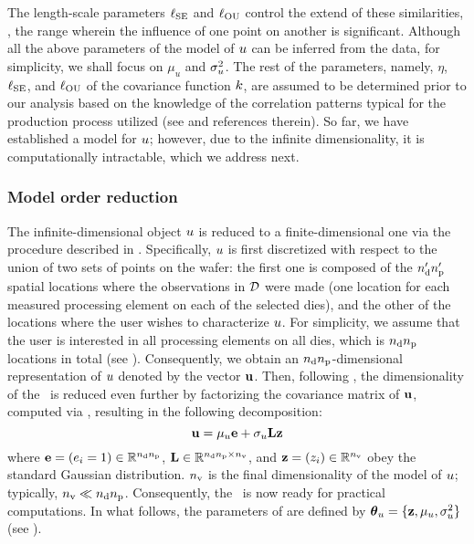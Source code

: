 The length-scale parameters $\ell_{\text{SE}}$ and $\ell_{\text{OU}}$ control the extend of these similarities, \ie, the range wherein the influence of one point on another is significant.
Although all the above parameters of the model of $u$ can be inferred from the data, for simplicity, we shall focus on $\mu_u$ and $\sigma_u^2$.
The rest of the parameters, namely, $\eta$, $\ell_{\text{SE}}$, and $\ell_{\text{OU}}$ of the covariance function $\fCov$, are assumed to be determined prior to our analysis based on the knowledge of the correlation patterns typical for the production process utilized (see \cite{marzouk2009} and references therein).
So far, we have established a model for $u$; however, due to the infinite dimensionality, it is computationally intractable, which we address next.

\subsubsection{Model order reduction} 
The infinite-dimensional object $u$ is reduced to a finite-dimensional one via the procedure described in .
Specifically, $u$ is first discretized with respect to the union of two sets of points on the wafer: the first one is composed of the ${n_\text{d}'} {n_\text{p}'}$ spatial locations where the observations in $\mathcal{D}$ were made (one location for each measured processing element on each of the selected dies), and the other of the locations where the user wishes to characterize $u$.
For simplicity, we assume that the user is interested in all processing elements on all dies, which is ${n_\text{d}} {n_\text{p}}$ locations in total (see ). Consequently, we obtain an ${n_\text{d}} {n_\text{p}}$-dimensional representation of $u$ denoted by the vector $\mathbf{u}$.
Then, following , the dimensionality of the \qoi\ is reduced even further by factorizing the covariance matrix of $\mathbf{u}$, computed via , resulting in the following decomposition:
\begin{equation} \elabel{kl-approximation}
  \vu = \mu_\u \vI + \sigma_\u \mKL \vz
\end{equation}
where $\mathbf{e} = (e_i = 1) \in \mathbb{R}^{{n_\text{d}} {n_\text{p}}}$, $\mathbf{L} \in \mathbb{R}^{{n_\text{d}} {n_\text{p}} \times {n_\text{v}}}$, and $\mathbf{z} = (z_i) \in \mathbb{R}^{n_\text{v}}$ obey the standard Gaussian distribution.
${n_\text{v}}$ is the final dimensionality of the model of $u$; typically, ${n_\text{v}} \ll {n_\text{d}} {n_\text{p}}$.
Consequently, the \qoi\ is now ready for practical computations.
In what follows, the parameters of  are defined by ${\boldsymbol\theta}_u = \{ \mathbf{z}, \mu_u, \sigma^2_u \}$ (see ).

